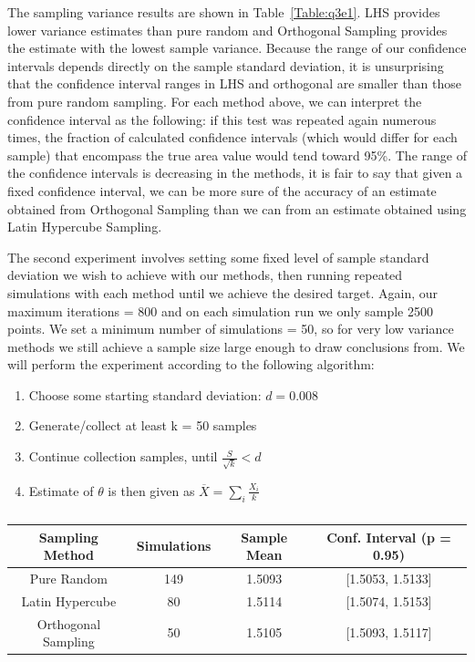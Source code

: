 \documentclass{article}
\begin{document}
    The sampling variance results are shown in Table~\ref{Table:q3e1}. LHS provides lower variance estimates than pure random and Orthogonal Sampling provides the estimate with the lowest sample variance. Because the range of our confidence intervals depends directly on the sample standard deviation, it is unsurprising that the confidence interval ranges in LHS and orthogonal are smaller than those from pure random sampling. For each method above, we can interpret the confidence interval as the following: if this test was repeated again numerous times, the fraction of calculated confidence intervals (which would differ for each sample) that encompass the true area value would tend toward 95\%. The range of the confidence intervals is decreasing in the methods, it is fair to say that given a fixed confidence interval, we can be more sure of the accuracy of an estimate obtained from Orthogonal Sampling than we can from an estimate obtained using Latin Hypercube Sampling.

    The second experiment involves setting some fixed level of sample standard deviation we wish to achieve with our methods, then running repeated simulations with each method until we achieve the desired target. Again, our maximum iterations = 800 and on each simulation run we only sample 2500 points. We set a minimum number of simulations = 50, so for very low variance methods we still achieve a sample size large enough to draw conclusions from. We will perform the experiment according to the following algorithm:
    \begin{enumerate}
        \item Choose some starting standard deviation: $d = 0.008$
        \item Generate/collect at least k = 50 samples
        \item Continue collection samples, until $\frac{S}{\sqrt{k}} < d$
        \item Estimate of $\theta$ is then given as $\overline{X} = \sum_{i} \frac{X_i}{k} $
    \end{enumerate}

    \begin{table}[h!]
        \centering
        \begin{tabular}{|c | c | c | c|}
            \hline
            Sampling Method & Simulations & Sample Mean & Conf. Interval (p = 0.95) \\
            \hline\hline
            Pure Random & 149 & 1.5093 & [1.5053, 1.5133] \\
            Latin Hypercube & 80 & 1.5114 & [1.5074, 1.5153] \\
            Orthogonal Sampling & 50 & 1.5105 & [1.5093, 1.5117] \\
            \hline
        \end{tabular}
        \caption{}
        \label{Table:q3e2}
    \end{table}
\end{document}
